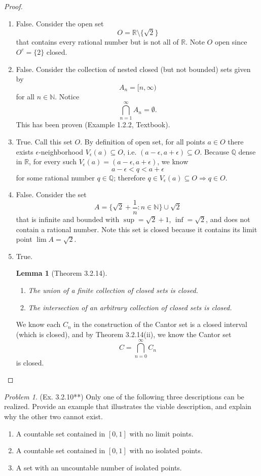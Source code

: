 \documentclass[11pt,twoside, reqno]{amsart}
\newtheorem{Lm}[Thm]{Lemma}
\theoremstyle{remark}
\newtheorem{Prob}{Problem}
\def\R{\mathbb R}
\def\Q{\mathbb Q}
\def\N{\mathbb N}
\renewcommand{\implies}{\Rightarrow}
\begin{document}
\begin{proof}
\begin{enumerate}
    \item [(a)] False. Consider the open set
    $$
        O = \R \setminus \{\sqrt{2}\}
    $$
    that contains every rational number but is not all of $\R$. Note $O$ open since $O^c = \{2\}$ closed.
    \item [(b)] False. Consider the collection of nested closed (but not bounded) sets given by
    $$
        A_n = [n,\infty)
    $$
    for all $n \in \N$. Notice
    $$
        \bigcap^\infty_{n=1} A_n = \emptyset.
    $$
    This has been proven (Example 1.2.2, Textbook).
    \item [(c)] True. Call this set $O$. By definition of open set, for all points $a \in O$ there exists $\epsilon$-neighborhood $V_\epsilon(a) \subseteq O$, i.e. $(a-\epsilon, a+ \epsilon) \subseteq O$. Because $\Q$ dense in $\R$, for every such $V_\epsilon(a) = (a-\epsilon, a+ \epsilon)$, we know
    $$
        a - \epsilon < q < a + \epsilon
    $$
    for some rational number $q \in \Q$; therefore $q \in V_\epsilon(a) \subseteq O \implies q \in O$.
    \item [(d)] False. Consider the set
    $$
        A = \{\sqrt{2} + \frac{1}{n} : n \in \N\} \cup \sqrt{2}
    $$
    that is infinite and bounded with $\sup = \sqrt{2} + 1$, $\inf = \sqrt{2}$, and does not contain a rational number. Note this set is closed because it contains its limit point $\lim A = \sqrt{2}$.
    \item [(e)] True. 
    \begin{Lm}[Theorem 3.2.14]
    \begin{enumerate}\;
        \item [(i)] The union of a finite collection of closed sets is closed.
        \item [(ii)] The intersection of an arbitrary collection of closed sets is closed.
    \end{enumerate}
    \end{Lm}
    We know each $C_n$ in the construction of the Cantor set is a closed interval (which is closed), and by Theorem 3.2.14(ii), we know the Cantor set
    $$
        C = \bigcap^\infty_{n=0} C_n
    $$
    is closed.
\end{enumerate}

\end{proof}

\begin{Prob}(Ex. 3.2.10**) Only one of the following three descriptions can be realized. Provide an example that illustrates the viable description, and explain why the other two cannot exist.
\begin{enumerate}
    \item [(i)] A countable set contained in $[0,1]$ with no limit points.
    \item [(ii)] A countable set contained in $[0,1]$ with no isolated points.
    \item [(iii)] A set with an uncountable number of isolated points.
\end{enumerate}
\end{Prob}
\end{document}
